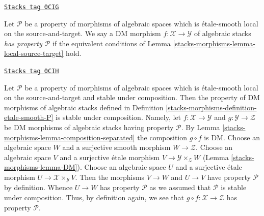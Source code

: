 \begin{definition}
\label{stacks-morphisms-definition-etale-smooth-P}
\href{https://stacks.math.columbia.edu/tag/0CIG}{\texttt{Stacks tag 0CIG}}

Let $\mathcal{P}$ be a property of morphisms of algebraic spaces
which is \'etale-smooth local on the source-and-target.
We say a DM morphism $f : \mathcal{X} \to \mathcal{Y}$ of algebraic stacks
{\it has property $\mathcal{P}$} if the equivalent conditions of
Lemma \ref{stacks-morphisms-lemma-local-source-target}
hold.
\end{definition}

\begin{remark}
\label{stacks-morphisms-remark-etale-smooth-composition}
\href{https://stacks.math.columbia.edu/tag/0CIH}{\texttt{Stacks tag 0CIH}}

Let $\mathcal{P}$ be a property of morphisms of algebraic spaces
which is \'etale-smooth local on the source-and-target and
stable under composition. Then the property of DM morphisms of algebraic stacks
defined in Definition \ref{stacks-morphisms-definition-etale-smooth-P}
is stable under composition. Namely, let $f : \mathcal{X} \to \mathcal{Y}$
and $g : \mathcal{Y} \to \mathcal{Z}$ be DM morphisms of algebraic stacks
having property $\mathcal{P}$. By Lemma \ref{stacks-morphisms-lemma-composition-separated}
the composition $g \circ f$ is DM. Choose an algebraic space $W$ and a
surjective smooth morphism $W \to \mathcal{Z}$. Choose an algebraic space
$V$ and a surjective \'etale morphism $V \to \mathcal{Y} \times_\mathcal{Z} W$
(Lemma \ref{stacks-morphisms-lemma-DM}).
Choose an algebraic space $U$ and a surjective \'etale morphism
$U \to \mathcal{X} \times_\mathcal{Y} V$. Then the morphisms
$V \to W$ and $U \to V$ have property $\mathcal{P}$ by definition.
Whence $U \to W$ has property $\mathcal{P}$ as we assumed that
$\mathcal{P}$ is stable under composition. Thus, by definition again,
we see that $g \circ f : \mathcal{X} \to \mathcal{Z}$ has
property $\mathcal{P}$.
\end{remark}

